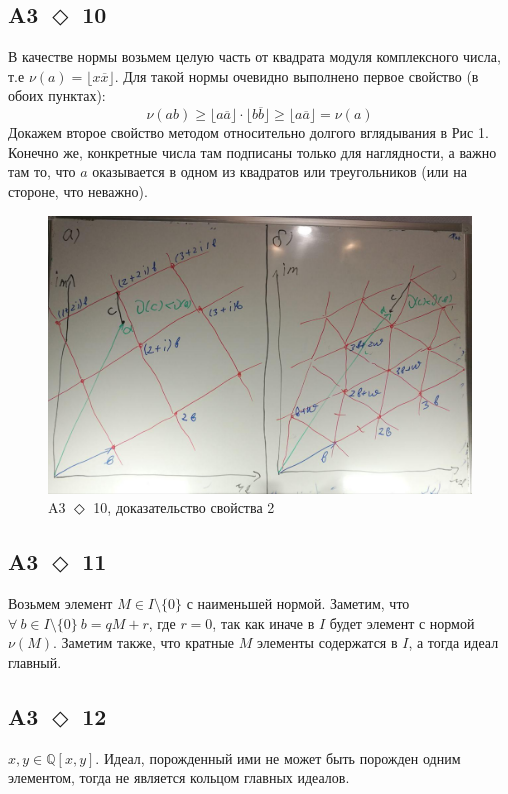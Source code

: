 \documentclass[a4paper]{article}
\newcommand{\task}[2]{A#1 $\Diamond$ #2}
\begin{document}
  \subsection*{\task{3}{10}}
  В качестве нормы возьмем целую часть от квадрата модуля комплексного числа, т.е
  $\nu(a) = \lfloor x\overline{x} \rfloor$. Для такой нормы очевидно выполнено первое свойство (в обоих пунктах):
  $$\nu(ab) \ge \lfloor a\overline{a} \rfloor \cdot \lfloor b\overline{b} \rfloor \ge \lfloor a\overline{a} \rfloor = \nu(a)$$
  Докажем второе свойство методом относительно долгого вглядывания в Рис 1. Конечно же, конкретные числа там подписаны только для наглядности, а важно там то, что $a$ оказывается в одном из квадратов или треугольников (или на стороне, что неважно).

  \begin{figure}[h]
  \includegraphics[width=\linewidth]{images/1.jpg}
  \caption{\task{3}{10}, доказательство свойства 2}
  \label{fig:somelabel}
  \end{figure}

  \subsection*{\task{3}{11}}
  Возьмем элемент $M \in I \setminus \{0\}$ с наименьшей нормой. Заметим, что $\forall \:b \in I\setminus\{0\} \: b = qM + r$, где $r = 0$, так как иначе в $I$ будет элемент с нормой $\nu(M)$. Заметим также, что кратные $M$ элементы содержатся в $I$, а тогда идеал главный.

  \subsection*{\task{3}{12}}
  $x,y \in \mathbb{Q}\left[x,y\right]$. Идеал, порожденный ими не может быть порожден одним элементом, тогда не является кольцом главных идеалов.
\end{document}
